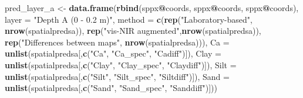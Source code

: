 \documentclass[]{book}
\newenvironment{Shaded}{\begin{snugshade}}{\end{snugshade}}
\newcommand{\DataTypeTok}[1]{\textcolor[rgb]{0.13,0.29,0.53}{#1}}
\newcommand{\KeywordTok}[1]{\textcolor[rgb]{0.13,0.29,0.53}{\textbf{#1}}}
\newcommand{\NormalTok}[1]{#1}
\newcommand{\OperatorTok}[1]{\textcolor[rgb]{0.81,0.36,0.00}{\textbf{#1}}}
\newcommand{\StringTok}[1]{\textcolor[rgb]{0.31,0.60,0.02}{#1}}
\begin{document}
\begin{Shaded}
\begin{Highlighting}[]
\NormalTok{pred_layer_a <-}\StringTok{ }\KeywordTok{data.frame}\NormalTok{(}\KeywordTok{rbind}\NormalTok{(sppx}\OperatorTok{@}\NormalTok{coords, }
\NormalTok{                                 sppx}\OperatorTok{@}\NormalTok{coords, }
\NormalTok{                                 sppx}\OperatorTok{@}\NormalTok{coords),}
                           \DataTypeTok{layer =} \StringTok{"Depth A (0 - 0.2 m)"}\NormalTok{,}
                           \DataTypeTok{method =} \KeywordTok{c}\NormalTok{(}\KeywordTok{rep}\NormalTok{(}\StringTok{"Laboratory-based"}\NormalTok{, }\KeywordTok{nrow}\NormalTok{(spatialpredsa)), }
                                      \KeywordTok{rep}\NormalTok{(}\StringTok{"vis-NIR augmented"}\NormalTok{,}\KeywordTok{nrow}\NormalTok{(spatialpredsa)),}
                                      \KeywordTok{rep}\NormalTok{(}\StringTok{"Differences between maps"}\NormalTok{, }\KeywordTok{nrow}\NormalTok{(spatialpredsa))), }
                           \DataTypeTok{Ca =} \KeywordTok{unlist}\NormalTok{(spatialpredsa[,}\KeywordTok{c}\NormalTok{(}\StringTok{"Ca"}\NormalTok{, }\StringTok{"Ca_spec"}\NormalTok{, }\StringTok{"Cadiff"}\NormalTok{)]),}
                           \DataTypeTok{Clay =} \KeywordTok{unlist}\NormalTok{(spatialpredsa[,}\KeywordTok{c}\NormalTok{(}\StringTok{"Clay"}\NormalTok{, }\StringTok{"Clay_spec"}\NormalTok{, }\StringTok{"Claydiff"}\NormalTok{)]),}
                           \DataTypeTok{Silt =} \KeywordTok{unlist}\NormalTok{(spatialpredsa[,}\KeywordTok{c}\NormalTok{(}\StringTok{"Silt"}\NormalTok{, }\StringTok{"Silt_spec"}\NormalTok{, }\StringTok{"Siltdiff"}\NormalTok{)]),}
                           \DataTypeTok{Sand =} \KeywordTok{unlist}\NormalTok{(spatialpredsa[,}\KeywordTok{c}\NormalTok{(}\StringTok{"Sand"}\NormalTok{, }\StringTok{"Sand_spec"}\NormalTok{, }\StringTok{"Sanddiff"}\NormalTok{)]))}


\end{Highlighting}
\end{Shaded}
\end{document}
